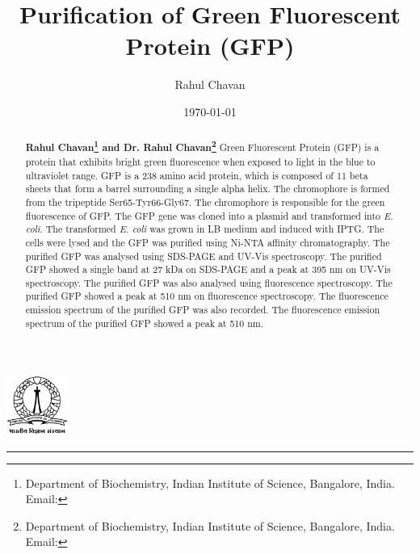 \documentclass{article}
\title{\textbf{Purification of Green Fluorescent Protein (GFP)}}
\author{Rahul Chavan }
\date{\today}
\renewcommand{\maketitle}{
 \begin{center}
    
        \includegraphics[width=2cm]{IISc_Master_Seal_Black.jpg}
        \vspace{0.5cm}

        \Large
        \textbf{\thetitle}
        
        \vspace{0.5cm}
        
        \Large
        \theauthor
        
        \vspace{0.2cm}
        
        \large
        \thedate

        \vspace{0.5cm}

        \hrule  
        
    \end{center}
}
\begin{document}
\maketitle



\begin{abstract}
    \textbf{Rahul Chavan\footnote{Department of Biochemistry, Indian Institute of Science, Bangalore, India. Email:} and Dr. Rahul Chavan\footnote{Department of Biochemistry, Indian Institute of Science, Bangalore, India. Email:}}
Green Fluorescent Protein (GFP) is a protein that exhibits bright green fluorescence when exposed to light in the blue to 
ultraviolet range. GFP is a 238 amino acid protein, which is composed of 11 beta sheets that form a barrel surrounding a 
single alpha helix. The chromophore is formed from the tripeptide Ser65-Tyr66-Gly67. The chromophore is responsible for 
the green fluorescence of GFP. The GFP gene was cloned into a plasmid and transformed into \textit{E. coli}. 
The transformed \textit{E. coli} was grown in LB medium and induced with IPTG. The cells were lysed and the GFP 
was purified using Ni-NTA affinity chromatography. The purified GFP was analysed using SDS-PAGE and UV-Vis spectroscopy. 
The purified GFP showed a single band at 27 kDa on SDS-PAGE and a peak at 395 nm on UV-Vis spectroscopy. 
The purified GFP was also analysed using fluorescence spectroscopy. The purified GFP showed a peak at 510 nm on 
fluorescence spectroscopy. The fluorescence emission spectrum of the purified GFP was also recorded. The fluorescence 
emission spectrum of the purified GFP showed a peak at 510 nm. 
\end{abstract}
\end{document}
